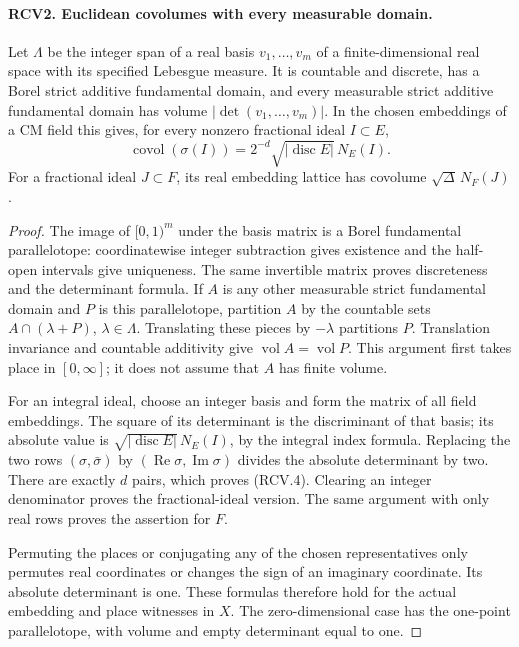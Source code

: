 \paragraph{RCV2. Euclidean covolumes with every measurable domain.}
\label{claim:RCV2}
Let \(\Lambda\) be the integer span of a real basis
\(v_1,\ldots,v_m\) of a finite-dimensional real space with its specified
Lebesgue measure.  It is countable and discrete, has a Borel strict
additive fundamental domain, and every measurable strict additive
fundamental domain has volume \(|\det(v_1,\ldots,v_m)|\).
In the chosen embeddings of a CM field this gives, for every nonzero
fractional ideal \(I\subset E\),
\[
 \operatorname{covol}(\sigma(I))
 =2^{-d}\sqrt{|\operatorname{disc}E|}\,N_E(I).
\tag{RCV.4}
\]
For a fractional ideal \(J\subset F\), its real embedding lattice has
covolume \(\sqrt{\Delta}\,N_F(J)\).
\begin{proof}
The image of \([0,1)^m\) under the basis matrix is a Borel fundamental
parallelotope: coordinatewise integer subtraction gives existence
and the half-open intervals give uniqueness.  The same invertible
matrix proves discreteness and the determinant formula.  If \(A\)
is any other measurable strict fundamental domain and \(P\) is this
parallelotope, partition \(A\) by the countable sets
\(A\cap(\lambda+P)\), \(\lambda\in\Lambda\).  Translating these
pieces by \(-\lambda\) partitions \(P\).  Translation invariance
and countable additivity give \(\operatorname{vol}A=
\operatorname{vol}P\).  This argument first takes place in
\([0,\infty]\); it does not assume that \(A\) has finite volume.

For an integral ideal, choose an integer basis and form the matrix
of all field embeddings.  The square of its determinant is the
discriminant of that basis; its absolute value is
\(\sqrt{|\operatorname{disc}E|}\,N_E(I)\), by the integral index
formula.  Replacing the two rows \((\sigma,\bar\sigma)\) by
\((\operatorname{Re}\sigma,\operatorname{Im}\sigma)\) divides
the absolute determinant by two.  There are exactly \(d\) pairs,
which proves (RCV.4).  Clearing an integer denominator proves the
fractional-ideal version.  The same argument with only real rows
proves the assertion for \(F\).

Permuting the places or conjugating any of the chosen representatives
only permutes real coordinates or changes the sign of an imaginary
coordinate.  Its absolute determinant is one.  These formulas
therefore hold for the actual embedding and place witnesses in
\(X\).  The zero-dimensional case has the one-point parallelotope,
with volume and empty determinant equal to one.
\end{proof}

